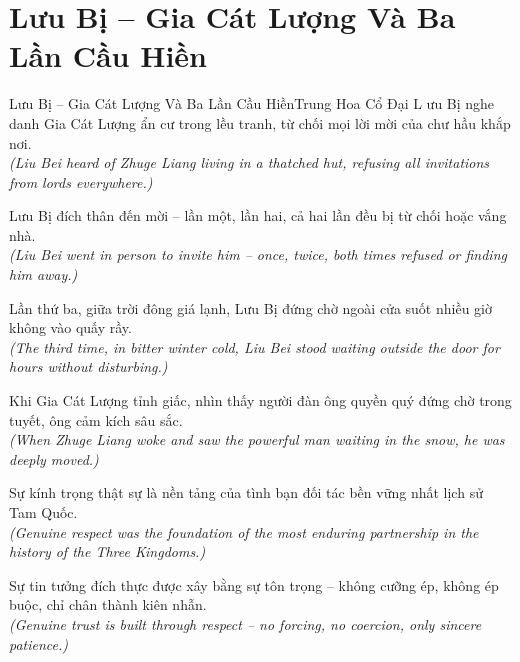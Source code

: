 \section{Lưu Bị -- Gia Cát Lượng Và Ba Lần Cầu Hiền}
\begin{truyen}{Lưu Bị -- Gia Cát Lượng Và Ba Lần Cầu Hiền}{Trung Hoa Cổ Đại}
L ưu Bị nghe danh Gia Cát Lượng ẩn cư trong lều tranh, từ chối mọi lời mời của chư hầu khắp nơi.\\
\textit{(Liu Bei heard of Zhuge Liang living in a thatched hut, refusing all invitations from lords everywhere.)}

Lưu Bị đích thân đến mời -- lần một, lần hai, cả hai lần đều bị từ chối hoặc vắng nhà.\\
\textit{(Liu Bei went in person to invite him -- once, twice, both times refused or finding him away.)}

Lần thứ ba, giữa trời đông giá lạnh, Lưu Bị đứng chờ ngoài cửa suốt nhiều giờ không vào quấy rầy.\\
\textit{(The third time, in bitter winter cold, Liu Bei stood waiting outside the door for hours without disturbing.)}

Khi Gia Cát Lượng tỉnh giấc, nhìn thấy người đàn ông quyền quý đứng chờ trong tuyết, ông cảm kích sâu sắc.\\
\textit{(When Zhuge Liang woke and saw the powerful man waiting in the snow, he was deeply moved.)}

Sự kính trọng thật sự là nền tảng của tình bạn đối tác bền vững nhất lịch sử Tam Quốc.\\
\textit{(Genuine respect was the foundation of the most enduring partnership in the history of the Three Kingdoms.)}

\end{truyen}
\begin{baihoc}
  Sự tin tưởng đích thực được xây bằng sự tôn trọng -- không cưỡng ép, không ép buộc, chỉ chân thành kiên nhẫn.\\
  \textit{(Genuine trust is built through respect -- no forcing, no coercion, only sincere patience.)}
\end{baihoc}
